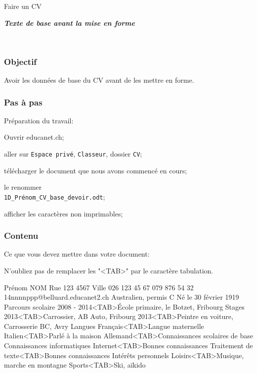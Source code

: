 \documentclass[frenchb]{scrartcl}
\begin{document}
\begin{center}
	{\huge Faire un CV}\par
	\textbf{\textit{Texte de base avant la mise en forme}}
\end{center}\smallskip\noindent\hrulefill{}\\[1ex]

\begin{multicols}{2}

\subsubsection*{Objectif}
Avoir les données de base du CV avant de les mettre en forme.


\subsubsection*{Pas à pas}
Préparation du travail:
\begin{compactenum}
	\item Ouvrir educanet.ch;
	\item aller sur \texttt{Espace privé}, \texttt{Classeur}, dossier \texttt{CV};
	\item télécharger le document que nous avons commencé en cours;
	\item le renommer\\ \texttt{1D\_Prénom\_CV\_base\_devoir.odt};
	\item afficher les caractères non imprimables;
\end{compactenum}

\subsubsection*{Contenu}
Ce que vous devez mettre dans votre document:

N'oubliez pas de remplacer les "<TAB>" par le caractère tabulation.
\end{multicols}

\begin{center}\begin{boxedverbatim}
	Prénom NOM
	Rue 123
	4567 Ville
	026 123 45 67
	079 876 54 32
	14nnnnppp@belluard.educanet2.ch
	Australien, permis C
	Né le 30 février 1919
	Parcours scolaire
	2008 - 2014<TAB>École primaire, le Botzet, Fribourg
	Stages
	2013<TAB>Carrossier, AB Auto, Fribourg
	2013<TAB>Peintre en voiture, Carrosserie BC, Avry
	Langues
	Français<TAB>Langue maternelle
	Italien<TAB>Parlé à la maison
	Allemand<TAB>Connaissances scolaires de base
	Connaissances informatiques
	Internet<TAB>Bonnes connaissances
	Traitement de texte<TAB>Bonnes connaissances
	Intérêts personnels
	Loisirs<TAB>Musique, marche en montagne
	Sports<TAB>Ski, aïkido
\end{boxedverbatim}
\end{center}
\end{document}
